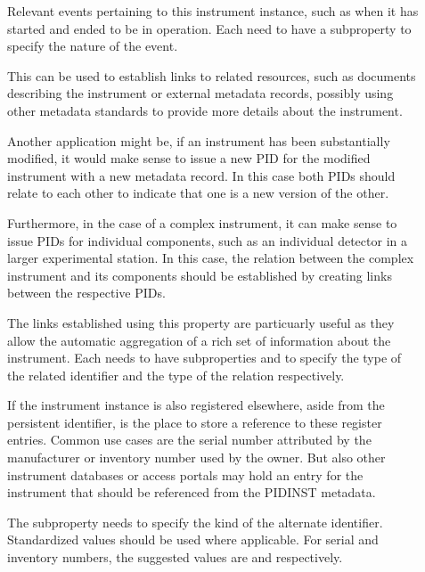 \documentclass[a4paper,10pt,english]{sphinxmanual}
\begin{document}
\begin{description}
\item[{}] \leavevmode
\sphinxAtStartPar
Relevant events pertaining to this instrument instance, such as when
it has started and ended to be in operation.  Each  need to
have a  subproperty to specify the nature of the event.

\item[{}] \leavevmode
\sphinxAtStartPar
This can be used to establish links to related resources, such as
documents describing the instrument or external metadata records,
possibly using other metadata standards to provide more details
about the instrument.

\sphinxAtStartPar
Another application might be, if an instrument has been
substantially modified, it would make sense to issue a new PID for
the modified instrument with a new metadata record.  In this case
both PIDs should relate to each other to indicate that one is a new
version of the other.

\sphinxAtStartPar
Furthermore, in the case of a complex instrument, it can make sense
to issue PIDs for individual components, such as an individual
detector in a larger experimental station.  In this case, the
relation between the complex instrument and its components should be
established by creating links between the respective PIDs.

\sphinxAtStartPar
The links established using this property are particuarly useful as
they allow the automatic aggregation of a rich set of information
about the instrument.  Each  needs to have
subproperties  and  to specify
the type of the related identifier and the type of the relation
respectively.

\item[{}] \leavevmode
\sphinxAtStartPar
If the instrument instance is also registered elsewhere, aside from
the persistent identifier,  is the place to
store a reference to these register entries.  Common use cases are
the serial number attributed by the manufacturer or inventory number
used by the owner.  But also other instrument databases or access
portals may hold an entry for the instrument that should be
referenced from the PIDINST metadata.

\sphinxAtStartPar
The subproperty  needs to specify the kind
of the alternate identifier.  Standardized values should be used
where applicable.  For serial and inventory numbers, the suggested
values are  and  respectively.

\end{description}
\end{document}
